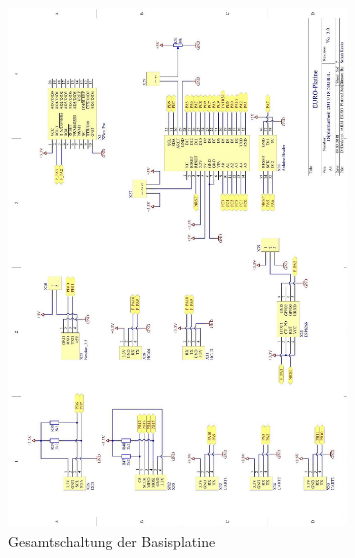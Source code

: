 \begin{figure}[htb]\ContinuedFloat
    \centering
    \includegraphics[width=0.8\textwidth]{Schuh/Pictures/Basis-Schaltung5}
    \caption[Gesamtschaltung der Basisplatine]{Gesamtschaltung der \gls{Basisplatine}}
\end{figure}

